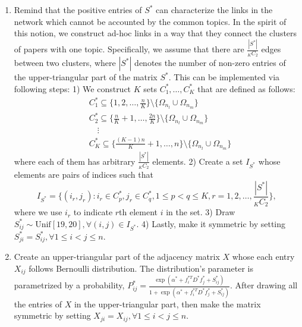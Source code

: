\documentclass[AMS,STIX1COL]{WileyNJD-v2}
\begin{document}
{\begin{enumerate}
    \item Remind that the positive entries of $S^*$ can characterize the links in the network which cannot be accounted by the common topics.
        In the spirit of this notion, we construct ad-hoc links in a way that they connect the clusters of papers with one topic.
        Specifically, we assume that there are $\frac{|S^*|}{_KC_{2}}$ edges between two clusters, where $|S^*|$ denotes the number of non-zero entries of the upper-triangular part of the matrix $S^*$.
        This can be implemented via following steps:
        1) We construct $K$ sets $C^*_1,\dots,C^*_K$ that are defined as follows:
        \begin{align*}
           &C^*_{1} \subseteq \big\{1, 2, \dots, \frac{n}{K} \big\} \setminus \big\{ \Omega_{n_l}
           \cup \Omega_{n_m} \big\} \\
           &C^*_{2} \subseteq \big\{\frac{n}{K}+1, \dots, \frac{2n}{K} \big\} \setminus \big\{ \Omega_{n_l} \cup \Omega_{n_m} \big\}  \\
           & \quad \vdots \\
           &C^*_{K} \subseteq \big\{\frac{(K-1)n}{K}+1, \dots, n \big\} \setminus \big\{ \Omega_{n_l}
           \cup \Omega_{n_m} \big\}
        \end{align*}
        where each of them has arbitrary $\frac{|S^*|}{_KC_{2}}$ elements.
        2) Create a set $I_{S^*}$ whose elements are pairs of indices such that
        \[
            I_{S^*} =
            \bigg\{ (i_r,j_r) : i_r \in C^*_p, j_r \in C^*_q, 1 \leq p < q \leq K,   r = 1,2,\dots,\frac{|S^*|}{_KC_{2}} \bigg\},
        \]
        where we use $i_r$ to indicate $r$th element $i$ in the set.
        3) Draw $S^*_{ij} \sim \mbox{Unif}[19,20], \forall (i,j) \in I_{S^*}$.
        4) Lastly, make it symmetric by setting $S^*_{ji}=S^*_{ij},\forall 1\leq i < j \leq n$.
    \item Create an upper-triangular part of the adjacency matrix $X$ whose each entry $X_{ij}$ follows Bernoulli distribution.
        The distribution's parameter is parametrized by a probability, $P^{*}_{ij}=\frac{\exp (\alpha^{*}+f^{*T}_{i}D^{*}f^{*}_{j} +  S^{*}_{ij})}{1+\exp(\alpha^{*}+f^{*T}_{i}D^{*}f^{*}_{j} +  S^{*}_{ij})}$.
        After drawing all the entries of $X$ in the upper-triangular part, then make the matrix symmetric by setting $X_{ji}=X_{ij},\forall 1 \leq i < j \leq n$.
\end{enumerate}


}
\end{document}
